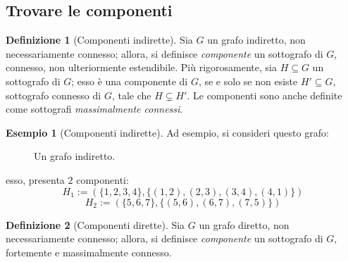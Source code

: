 \documentclass[14pt]{extreport}
\theoremstyle{definition}
\newtheorem{definition}{Definizione}[subsection]
\theoremstyle{definition}
\newtheorem{example}{Esempio}[subsection]
\begin{document}
\subsection{Trovare le componenti}

\begin{definition}[Componenti indirette]
    Sia $G$ un grafo indiretto, non necessariamente connesso; allora, si definisce \textit{componente} un sottografo di $G$, connesso, non ulteriormente estendibile. Più rigorosamente, sia $H \subseteq G$ un sottografo di $G$; esso è una componente di $G$, se e solo se non esiste $H' \subseteq G$, sottografo connesso di $G$, tale che $H \subsetneq H'$. Le componenti sono anche definite come sottografi \textit{massimalmente connessi}.
\end{definition}

\begin{example}[Componenti indirette]
    Ad esempio, si consideri questo grafo:

    \begin{figure}[H]
        \centering
        \caption{Un grafo indiretto.}
    \end{figure}

    esso, presenta $2$ componenti: $$H_1 := (\{1, 2, 3, 4\}, \{(1, 2), (2, 3), (3, 4), (4, 1)\})$$ $$H_2 := (\{5, 6, 7\}, \{(5, 6), (6, 7), (7, 5)\})$$
\end{example}

\begin{definition}[Componenti dirette]
    Sia $G$ un grafo diretto, non necessariamente connesso; allora, si definisce \textit{componente} un sottografo di $G$, fortemente e massimalmente connesso.
\end{definition}
\end{document}
